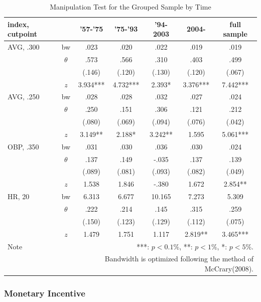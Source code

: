 \documentclass[dvipdfmx, 12pt]{article}
\begin{document}
\begin{table}
  \centering
  \caption{Manipulation Test for the Grouped Sample by Time}
  \label{Mani-Era}
  \footnotesize
  \begin{tabular}{lcccccc} \hline
    index, cutpoint &  & '57-'75 &'75-'93 & '94-2003 & 2004- &full sample \\ \hline \hline
    AVG, .300 & bw & .023 & .020 & .022 & .019 & .019 \\
    & $\theta$ & .573 & .566 & .310 & .403 & .499 \\
    & & (.146) & (.120) & (.130) & (.120) & (.067) \\
    & $z$ & 3.934*** & 4.732*** & 2.393* & 3.376*** & 7.442*** \\ \hline
    AVG, .250 & bw & .028 & .028 & .032 & .027 & .024 \\
    & $\theta$ & .250 & .151 & .306 & .121 & .212 \\
    & & (.080) & (.069) & (.094)& (.076) & (.042) \\
    & $z$ & 3.149** & 2.188* & 3.242** & 1.595 & 5.061*** \\ \hline
    OBP, .350 & bw & .031 & .030 & .036 & .030 & .024 \\
    & $\theta$ & .137 & .149 & -.035 & .137 & .139 \\
    & & (.089) & (.081) & (.093) & (.082) & (.049) \\
    & $z$ & 1.538 & 1.846 & -.380 & 1.672 & 2.854** \\ \hline
    HR, 20 & bw & 6.313 & 6.677 & 10.165 & 7.273 & 5.309 \\
    & $\theta$ & .222 & .214 & .145 & .315 & .259 \\
    & & (.150) & (.123) & (.129) & (.112) & (.075) \\
    & $z$ & 1.479 & 1.751 & 1.117 & 2.819** & 3.465*** \\ \hline
    Note & \multicolumn{6}{r}{
    ***: $p<0.1\%$, **: $p<1\%$, *: $p<5\%$.
    }\\
    & \multicolumn{6}{r}{
    Bandwidth is optimized following the method of McCrary(2008).
    }
  \end{tabular}
\end{table}







\subsubsection{Monetary Incentive}
\end{document}

